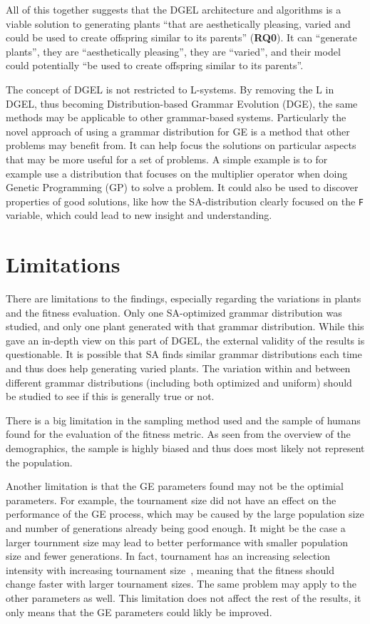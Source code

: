 All of this together suggests that the DGEL architecture and algorithms is a viable solution to generating plants ``that are aesthetically pleasing, varied and could be used to create offspring similar to its parents'' (\textbf{RQ0}).
It can ``generate plants'', they are ``aesthetically pleasing'', they are ``varied'', and their model could potentially ``be used to create offspring similar to its parents''.

The concept of DGEL is not restricted to L-systems.
By removing the L in DGEL, thus becoming Distribution-based Grammar Evolution (DGE), the same methods may be applicable to other grammar-based systems.
Particularly the novel approach of using a grammar distribution for GE is a method that other problems may benefit from.
It can help focus the solutions on particular aspects that may be more useful for a set of problems.
A simple example is to for example use a distribution that focuses on the multiplier operator when doing Genetic Programming (GP) to solve a problem.
It could also be used to discover properties of good solutions, like how the SA-distribution clearly focused on the \texttt{F} variable, which could lead to new insight and understanding.

\section{Limitations}
There are limitations to the findings, especially regarding the variations in plants and the fitness evaluation.
Only one SA-optimized grammar distribution was studied, and only one plant generated with that grammar distribution.
While this gave an in-depth view on this part of DGEL, the external validity of the results is questionable.
It is possible that SA finds similar grammar distributions each time and thus does help generating varied plants.
The variation within and between different grammar distributions (including both optimized and uniform) should be studied to see if this is generally true or not.

There is a big limitation in the sampling method used and the sample of humans found for the evaluation of the fitness metric.
As seen from the overview of the demographics, the sample is highly biased and thus does most likely not represent the population.

Another limitation is that the GE parameters found may not be the optimial parameters.
For example, the tournament size did not have an effect on the performance of the GE process, which may be caused by the large population size and number of generations already being good enough.
It might be the case a larger tournment size may lead to better performance with smaller population size and fewer generations.
In fact, tournament has an increasing selection intensity with increasing tournament size~\cite{1995Blickle}, meaning that the fitness should change faster with larger tournament sizes.
The same problem may apply to the other parameters as well.
This limitation does not affect the rest of the results, it only means that the GE parameters could likly be improved.

